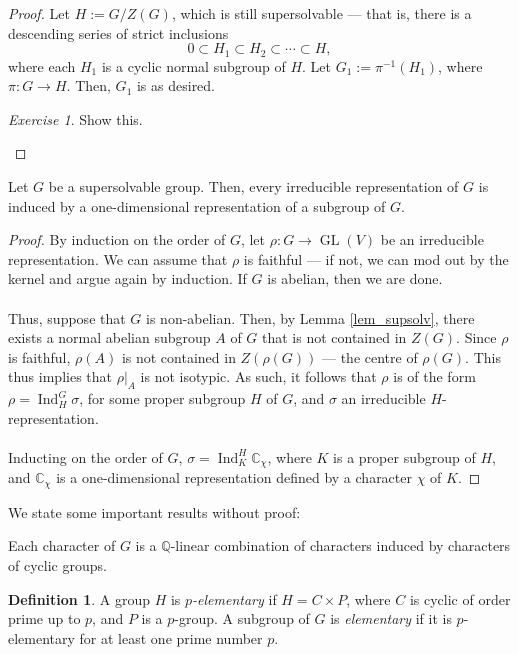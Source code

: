 \documentclass[a4paper]{report}
\theoremstyle{definition}
\newtheorem{definition}{Definition}
\theoremstyle{remark}
\theoremstyle{proposition}
\theoremstyle{conjecture}
\theoremstyle{lemma}
\theoremstyle{corollary}
\theoremstyle{exercise}
\newtheorem{exercise}{Exercise}
\theoremstyle{example}
\newcommand{\C}{\mathbb{C}}
\newcommand{\on}{\operatorname}
\begin{document}
\begin{proof}
    Let $H := G/Z(G)$, which is still supersolvable --- that is, there is a 
    descending series of strict inclusions
    $$0 \subset H_1 \subset H_2 \subset \cdots \subset H,$$
    where each $H_1$ is a cyclic normal subgroup of $H$.
    Let $G_1 := \pi^{-1}(H_1)$, where $\pi : G \to H$.
    Then, $G_1$ is as desired.
    \begin{exercise}
        Show this.
    \end{exercise}
\end{proof}

\begin{theorem}
    Let $G$ be a supersolvable group. Then, every irreducible representation 
    of $G$ is induced by a one-dimensional representation of a subgroup 
    of $G$.
\end{theorem}

\begin{proof}
    By induction on the order of $G$, let $\rho : G \to \on{GL}(V)$ be 
    an irreducible representation. We can assume that $\rho$ is faithful --- 
    if not, we can mod out by the kernel and argue again by induction.
    If $G$ is abelian, then we are done.\\\\
    Thus, suppose that $G$ is non-abelian. Then, by Lemma \ref{lem_supsolv},
    there exists a normal abelian subgroup $A$ of $G$ that is not 
    contained in $Z(G)$. Since $\rho$ is faithful, $\rho(A)$ is not 
    contained in $Z(\rho(G))$ --- the centre of $\rho(G)$.
    This thus implies that $\rho\vert_A$ is not isotypic. As such,
    it follows that $\rho$ is of the form $\rho = \on{Ind}_H^G\sigma$,
    for some proper subgroup $H$ of $G$, and $\sigma$ an irreducible
    $H$-representation.\\\\
    Inducting on the order of $G$, $\sigma = \on{Ind}_K^H \C_\chi$,
    where $K$ is a proper subgroup of $H$, and $\C_\chi$ is a 
    one-dimensional representation defined by a character $\chi$ of $K$.
\end{proof}

We state some important results without proof:

\begin{theorem}
    Each character of $G$ is a $\mathbb{Q}$-linear combination 
    of characters induced by characters of cyclic groups.
\end{theorem}

\begin{definition}
    A group $H$ is \emph{$p$-elementary} if $H = C \times P$, 
    where $C$ is cyclic of order prime up to $p$, and 
    $P$ is a $p$-group. A subgroup of $G$ is \emph{elementary}
    if it is $p$-elementary for at least one prime number $p$.
\end{definition}
\end{document}
